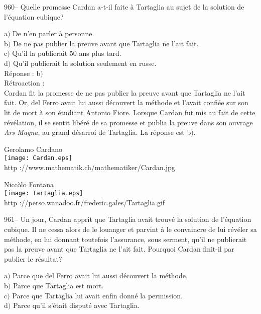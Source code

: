 ﻿\documentclass[letterpaper, 12pt]{article}
\begin{document}
960-- Quelle promesse Cardan a-t-il faite \`a Tartaglia au sujet de
la solution de l'\'equation cubique?

a$)$ De n'en parler \`a personne.\\
b$)$ De ne pas publier la preuve avant que Tartaglia ne l'ait fait.  \\
c$)$ Qu'il la publierait 50 ans plus tard.  \\
d$)$ Qu'il publierait la solution seulement en russe. \\

R\'eponse : b$)$\\

R\'etroaction :\\
Cardan fit la promesse de ne pas publier la preuve avant que
Tartaglia ne l'ait fait. Or, del Ferro avait lui aussi d\'ecouvert
la m\'ethode et l'avait confi\'ee sur son lit de mort \`a son
\'etudiant Antonio Fiore. Lorsque Cardan fut mis au fait de cette
r\'ev\'elation,
il se sentit lib\'er\'e de sa promesse et publia la preuve dans son ouvrage
{\sl Ars Magna}, au grand d\'esarroi de Tartaglia. La r\'eponse est b$)$.\\
        \begin{center}
        Gerolamo Cardano\\
    \texttt{[image: Cardan.eps]}\\
        {\footnotesize http ://www.mathematik.ch/mathematiker/Cardan.jpg}
    \end{center}

        \begin{center}
        Nicc\`olo Fontana\\
    \texttt{[image: Tartaglia.eps]}\\
        {\footnotesize http
://perso.wanadoo.fr/frederic.gales/Tartaglia.gif}
    \end{center}

961-- Un jour, Cardan apprit que Tartaglia avait trouv\'e la
solution de l'\'equation cubique. Il ne cessa alors de le louanger
et parvint \`a le convaincre de lui r\'ev\'eler sa m\'ethode, en lui
donnant toutefois l'assurance, sous serment, qu'il ne publierait pas
la preuve avant que Tartaglia ne l'ait fait. Pourquoi Cardan
finit-il par publier le r\'esultat?

a$)$ Parce que del Ferro avait lui aussi d\'ecouvert la m\'ethode. \\
b$)$ Parce que Tartaglia est mort.  \\
c$)$ Parce que Tartaglia lui avait enfin donn\'e la permission.  \\
d$)$ Parce qu'il s'\'etait disput\'e avec Tartaglia. \\
\end{document}
